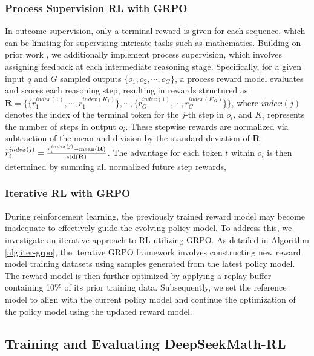 \subsubsection{Process Supervision RL with GRPO} In outcome supervision, only a terminal reward is given for each sequence, which can be limiting for supervising intricate tasks such as mathematics. Building on prior work \cite{wang2023math}, we additionally implement process supervision, which involves assigning feedback at each intermediate reasoning stage. Specifically, for a given input $q$ and $G$ sampled outputs $\{o_1, o_2, \cdots, o_G\}$, a process reward model evaluates and scores each reasoning step, resulting in rewards structured as $\mathbf{R} = \{ \{r_1^{index(1)},\cdots,r_1^{index(K_1)}\}, \cdots,  \{r_G^{index(1)},\cdots,r_G^{index(K_G)}\} \}$, where $index(j)$ denotes the index of the terminal token for the $j$-th step in $o_i$, and $K_i$ represents the number of steps in output $o_i$. These stepwise rewards are normalized via subtraction of the mean and division by the standard deviation of $\mathbf{R}$: $\widetilde{r}_i^{index(j)} = \frac{r_i^{index(j)} - {\rm mean(\mathbf{R})}}{{\rm std(\mathbf{R})}}$. The advantage for each token $t$ within $o_i$ is then determined by summing all normalized future step rewards,

\subsubsection{Iterative RL with GRPO} During reinforcement learning, the previously trained reward model may become inadequate to effectively guide the evolving policy model. To address this, we investigate an iterative approach to RL utilizing GRPO. As detailed in Algorithm \ref{alg:iter-grpo}, the iterative GRPO framework involves constructing new reward model training datasets using samples generated from the latest policy model. The reward model is then further optimized by applying a replay buffer containing 10\% of its prior training data. Subsequently, we set the reference model to align with the current policy model and continue the optimization of the policy model using the updated reward model.

\subsection{Training and Evaluating DeepSeekMath-RL}

